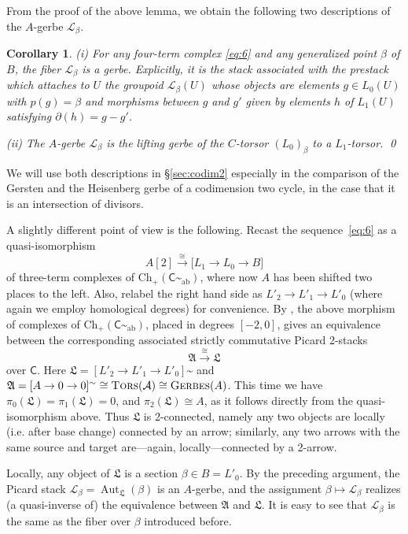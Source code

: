 \documentclass{amsart}
\numberwithin{equation}{subsection}
\newtheorem{corollary}[theorem]{Corollary}
\theoremstyle{remark}
\theoremstyle{remark}
\newcommand{\ie}{i.e.\xspace}
\newcommand{\too}{\longrightarrow}%
\newcommand{\cA}{\mathcal{A}}
\newcommand{\cL}{\mathcal{L}}
\newcommand{\fA}{\mathfrak{A}}
\newcommand{\fL}{\mathfrak{L}}
\DeclareMathOperator{\Aut}{Aut}
\newcommand{\C}{\mathsf{C}} %
\newcommand{\ch}{\mathrm{Ch}} %
\DeclareMathOperator{\ger}{\textsc{Gerbes}} %
\newcommand{\iso}{\cong}
\newcommand{\shC}{\C\sptilde} %
\newcommand{\shAbC}{\shC_\mathrm{ab}} %
\DeclareMathOperator{\tors}{\textsc{Tors}} %
\begin{document}
From the proof of the above lemma, we obtain the following  two descriptions of the $A$-gerbe $\cL_{\beta}$. 
 \begin{corollary}\label{diversi} (i) For any four-term complex  \eqref{eq:6} and any generalized point $\beta$ of $B$, the fiber  $\cL_{\beta}$ is a gerbe. Explicitly, it is the stack associated with the prestack which attaches to $U$ the groupoid $\cL_{\beta}(U)$ whose objects are elements $g \in L_0(U)$ with $p(g) = \beta$ and morphisms between $g$ and $g'$ given by elements $h$ of $L_1(U)$ satisfying $\partial(h) = g-g'$.
 
 (ii)  The $A$-gerbe $\cL_{\beta}$ is the lifting gerbe of the $C$-torsor $(L_0)_{\beta}$ to a $L_1$-torsor. \qed
\end{corollary}
We will use both descriptions in \S \ref{sec:codim2} especially in the comparison of the Gersten and the Heisenberg gerbe of a codimension two cycle, in the case that it  is an intersection of divisors. 

A slightly different point of view is the following. Recast the sequence~\eqref{eq:6} as a quasi-isomorphism
\begin{equation*}
  A[2] \overset{\iso}{\too} \bigl[ L_1\too L_0\too B \bigr]
\end{equation*}
of three-term complexes of $\ch_+(\shAbC)$, where now $A$ has been shifted two places to the left. Also, relabel the right hand side as $L'_2\to L'_1\to L'_0$ (where again we employ homological degrees) for convenience. By \cite{Tatar}, the above morphism of complexes of $\ch_+(\shAbC)$, placed in degrees $[-2,0]$, gives an equivalence between the corresponding associated strictly commutative Picard 2-stacks
\begin{equation*}
  \fA \overset{\iso}{\too} \fL
\end{equation*}
over $\C$. Here $\fL = [L'_2\to L'_1\to L'_0]\sptilde$ and $\fA = [A\to 0\to 0]\sptilde \iso \tors (\cA)\iso \ger (A)$. This time we have $\pi_0(\fL) = \pi_1(\fL) = 0$, and $\pi_2(\fL)\iso A$, as it follows directly from the quasi-isomorphism above. Thus $\fL$ is 2-connected, namely any two objects are locally (\ie after base change) connected by an arrow; similarly, any two arrows with the same source and target are---again, locally---connected by a 2-arrow.

Locally, any object of $\fL$ is a section $\beta\in B=L'_0$. By the preceding argument, the Picard stack $\cL_\beta = \Aut_\fL(\beta)$ is an $A$-gerbe, and the assignment $\beta \mapsto \cL_\beta$ realizes (a quasi-inverse of) the equivalence between $\fA$ and $\fL$. It is easy to see that $\cL_\beta$ is the same as the fiber over $\beta$ introduced before.
\end{document}
